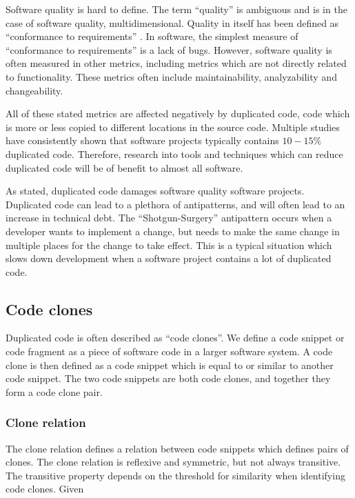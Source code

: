 \documentclass[12pt]{article}
\begin{document}
Software quality is hard to define. The term ``quality'' is ambiguous and is in the case
of software quality, multidimensional. Quality in itself has been defined as ``conformance
to requirements'' \cite[8]{crosby1980quality}. In software, the simplest measure of
``conformance to requirements'' is a lack of bugs. However, software
quality is often measured in other metrics, including metrics which are not directly
related to functionality\cite[29]{MetricsAndModelsInSoftwareQuality}. These metrics
often include maintainability, analyzability and changeability.

All of these stated metrics are affected negatively by duplicated code, code which is more
or less copied to different locations in the source code. Multiple studies have consistently
shown that software projects typically contains $10-15\%$ duplicated
code\cite{CloningByAccident}. Therefore, research into tools and techniques which can
reduce duplicated code will be of benefit to almost all software.

As stated, duplicated code damages software quality software projects. Duplicated code can
lead to a plethora of antipatterns, and will often lead to an
increase in technical debt. The ``Shotgun-Surgery''\cite[66]{fowlerrefactoring} antipattern
occurs when a developer wants to implement a change, but needs to make the same change in
multiple places for the change to take effect. This is a typical situation which slows down
development when a software project contains a lot of duplicated code.

\subsection{Code clones}

Duplicated code is often described as ``code clones''. We define a code snippet or code
fragment as a piece of software code in a larger software system. A code clone is then
defined as a code snippet which is equal to or similar to another code snippet. The two
code snippets are both code clones, and together they form a code clone pair.

\subsubsection{Clone relation}

The clone relation defines a relation between code snippets which defines pairs of clones.
The clone relation is reflexive and symmetric, but not always transitive. The transitive
property depends on the threshold for similarity when identifying code clones. Given
\end{document}
